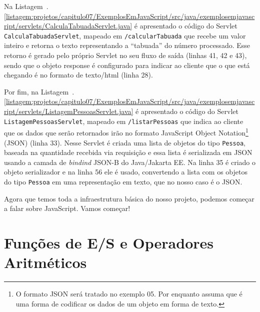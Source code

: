 Na Listagem~\thechapter.\ref{listagem:projetos/capitulo07/ExemplosEmJavaScript/src/java/exemplosemjavascript/servlets/CalculaTabuadaServlet.java} é apresentado o código do Servlet \texttt{CalculaTabuadaServlet}, mapeado em \texttt{/calcularTabuada} que recebe um valor inteiro e retorna o texto representando a ``tabuada'' do número processado. Esse retorno é gerado pelo próprio Servlet no seu fluxo de saída (linhas 41, 42 e 43), sendo que o objeto response é configurado para indicar ao cliente que o que está chegando é no formato de texto/html (linha 28).


Por fim, na Listagem~\thechapter.\ref{listagem:projetos/capitulo07/ExemplosEmJavaScript/src/java/exemplosemjavascript/servlets/ListagemPessoasServlet.java} é apresentado o código do Servlet \texttt{ListagemPessoasServlet}, mapeado em \texttt{/listarPessoas} que indica ao cliente que os dados que serão retornados irão no formato JavaScript Object Notation\footnote{O formato JSON será tratado no exemplo 05. Por enquanto assuma que é uma forma de codificar os dados de um objeto em forma de texto.} (JSON) (linha 33). Nesse Servlet é criada uma lista de objetos do tipo \texttt{Pessoa}, baseada na quantidade recebida via requisição e essa lista é serializada em JSON usando a camada de \textit{bindind} JSON-B do Java/Jakarta EE. Na linha 35 é criado o objeto serializador e na linha 56 ele é usado, convertendo a lista com os objetos do tipo \texttt{Pessoa} em uma representação em texto, que no nosso caso é o JSON.


Agora que temos toda a infraestrutura básica do nosso projeto, podemos começar a falar sobre JavaScript. Vamos começar!



\section{Funções de E/S e Operadores Aritméticos}


